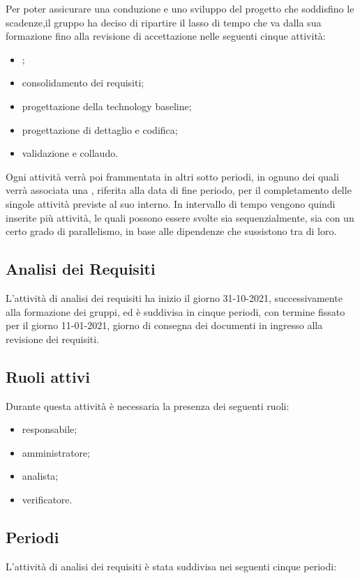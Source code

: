 Per poter assicurare una conduzione e uno sviluppo del progetto che soddisfino le scadenze,il gruppo ha deciso di ripartire il lasso di tempo che va dalla sua formazione fino alla revisione di accettazione nelle seguenti cinque attività:
	
	\begin{itemize}
		\item {};
		\item consolidamento dei requisiti;
		\item progettazione della technology baseline;
		\item progettazione di dettaglio e codifica;
		\item validazione e collaudo.
	\end{itemize}	
	Ogni attività verrà poi frammentata in altri sotto periodi, in ognuno dei quali verrà associata una ,
	riferita alla data di fine periodo, per il completamento delle singole attività previste al suo interno.
	In intervallo di tempo vengono quindi inserite più attività, le quali possono essere svolte sia sequenzialmente,
	sia con un certo grado di parallelismo, in base alle dipendenze che sussistono tra di loro.
	
	\subsection{Analisi dei Requisiti}
	L’attività di analisi dei requisiti ha inizio il giorno 31-10-2021, successivamente alla formazione dei
	gruppi, ed è suddivisa in cinque periodi, con termine fissato per il giorno 11-01-2021, giorno di consegna dei documenti in ingresso alla revisione dei requisiti.
	
	\subsection{Ruoli attivi}
	Durante questa attività è necessaria la presenza dei seguenti ruoli:
	\begin{itemize}
		\item responsabile;
		\item amministratore;
		\item analista;
		\item verificatore.
	\end{itemize}

	\subsection{Periodi}
	L'attività di analisi dei requisiti è stata suddivisa nei seguenti cinque periodi:
	
